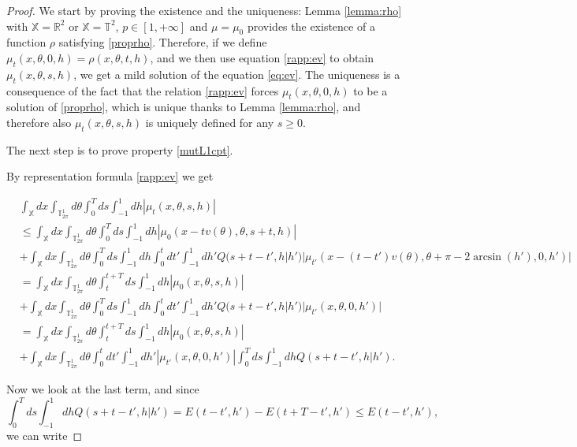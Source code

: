 \documentclass[10pt,a4paper]{amsart}
\begin{document}
\begin{proof}
We start by proving the existence and the uniqueness: Lemma \ref{lemma:rho} with $\mathbb{X}=\mathbb{R}^2$ or $\mathbb{X}=\mathbb{T}^2$, $p\in[1,+\infty]$ and $\mu=\mu_0$ provides the existence of a function $\rho$ satisfying \eqref{proprho}. Therefore, if we define $\mu_t(x,\theta,0,h)=\rho(x,\theta,t,h)$, and we then use equation \eqref{rapp:ev} to obtain $\mu_t(x,\theta,s,h)$, we get a mild solution of the equation \eqref{eq:ev}. The uniqueness is a consequence of the fact that the relation \eqref{rapp:ev} forces $\mu_t(x,\theta,0,h)$ to be a solution of \eqref{proprho}, which is unique thanks to Lemma \ref{lemma:rho}, and therefore also $\mu_t(x,\theta,s,h)$ is uniquely defined for any $s\geq0$.

The next step is to prove property \eqref{mutL1cpt}.

By representation formula \eqref{rapp:ev} we get

{\tiny\begin{align*}
&\int_{\mathbb{X}}dx\int_{\mathbb{T}^1_{2\pi}}d\theta\int_0^Tds\int_{-1}^1dh|\mu_t(x,\theta,s,h)|
\\
&\leq\int_{\mathbb{X}}dx\int_{\mathbb{T}^1_{2\pi}}d\theta\int_0^Tds\int_{-1}^1dh|\mu_0(x-tv(\theta),\theta,s+t,h)|
\\
&+\int_{\mathbb{X}}dx\int_{\mathbb{T}^1_{2\pi}}d\theta\int_0^Tds\int_{-1}^1dh\int_0^tdt'\int_{-1}^1dh' Q(s+t-t',h|h')|\mu_{t'}(x-(t-t')v(\theta),\theta+\pi-2\arcsin(h'),0,h')|
\\
&=\int_{\mathbb{X}}dx\int_{\mathbb{T}^1_{2\pi}}d\theta\int_t^{t+T}ds\int_{-1}^1dh|\mu_0(x,\theta,s,h)|
\\
&+\int_{\mathbb{X}}dx\int_{\mathbb{T}^1_{2\pi}}d\theta\int_0^Tds\int_{-1}^1dh\int_0^tdt'\int_{-1}^1dh' Q(s+t-t',h|h')|\mu_{t'}(x,\theta,0,h')|
\\
&=\int_{\mathbb{X}}dx\int_{\mathbb{T}^1_{2\pi}}d\theta\int_t^{t+T}ds\int_{-1}^1dh|\mu_0(x,\theta,s,h)|
\\
&+\int_{\mathbb{X}}dx\int_{\mathbb{T}^1_{2\pi}}d\theta\int_0^tdt'\int_{-1}^1dh' |\mu_{t'}(x,\theta,0,h')|\int_0^Tds\int_{-1}^1dhQ(s+t-t',h|h').
\end{align*}}

Now we look at the last term, and since
\[
\int_0^Tds\int_{-1}^1dhQ(s+t-t',h|h')=E(t-t',h')-E(t+T-t',h')\leq E(t-t',h'),
\]
we can write


\end{proof}
\end{document}
